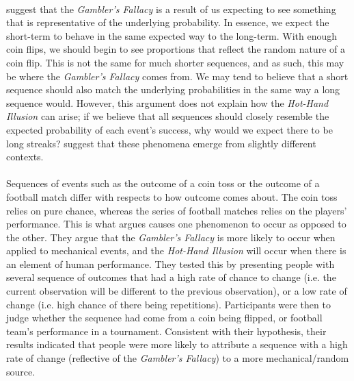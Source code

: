 \documentclass[12pt]{article}
\begin{document}
\paragraph{} \cite{KAHNEMAN1972430} suggest that the \textit{Gambler's Fallacy} is a result of us expecting to see something that is representative of the underlying probability. In essence, we expect the short-term to behave in the same expected way to the long-term. With enough coin flips, we should begin to see proportions that reflect the random nature of a coin flip. This is not the same for much shorter sequences, and as such, this may be where the \textit{Gambler's Fallacy} comes from. We may tend to believe that a short sequence should also match the underlying probabilities in the same way a long sequence would. However, this argument does not explain how the \textit{Hot-Hand Illusion} can arise; if we believe that all sequences should closely resemble the expected probability of each event's success, why would we expect there to be long streaks? \cite{Ayton2004} suggest that these phenomena emerge from slightly different contexts.

\paragraph{} Sequences of events such as the outcome of a coin toss or the outcome of a football match differ with respects to how outcome comes about. The coin toss relies on pure chance, whereas the series of football matches relies on the players' performance. This is what \cite{Ayton2004} argues causes one phenomenon to occur as opposed to the other. They argue that the \textit{Gambler's Fallacy} is more likely to occur when applied to mechanical events, and the \textit{Hot-Hand Illusion} will occur when there is an element of human performance. They tested this by presenting people with several sequence of outcomes that had a high rate of chance to change (i.e. the current observation will be different to the previous observation), or a low rate of change (i.e. high chance of there being repetitions). Participants were then to judge whether the sequence had come from a coin being flipped, or football team's performance in a tournament. Consistent with their hypothesis, their results indicated that people were more likely to attribute a sequence with a high rate of change (reflective of the \textit{Gambler's Fallacy}) to a more mechanical/random source. 
\end{document}
